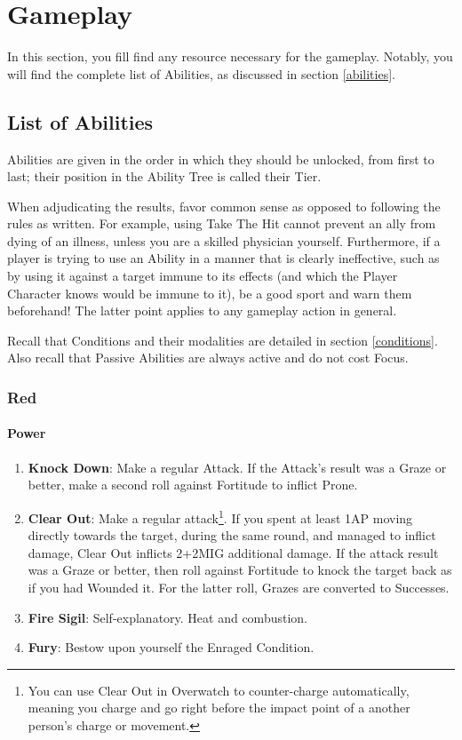 \chapter{Gameplay}

In this section, you fill find any resource necessary for the gameplay. Notably, you will find the complete list of Abilities, as discussed in section \ref{abilities}.

\section{List of Abilities}
\label{abilities_list}

Abilities are given in the order in which they should be unlocked, from first to last; their position in the Ability Tree is called their Tier. 

When adjudicating the results, favor common sense as opposed to following the rules as written. For example, using Take The Hit cannot prevent an ally from dying of an illness, unless you are a skilled physician yourself. Furthermore, if a player is trying to use an Ability in a manner that is clearly ineffective, such as by using it against a target immune to its effects (and which the Player Character knows would be immune to it), be a good sport and warn them beforehand! The latter point applies to any gameplay action in general.

Recall that Conditions and their modalities are detailed in section \ref{conditions}. Also recall that Passive Abilities are always active and do not cost Focus.

\subsection{Red}

\subsubsection{Power}
\begin{enumerate}
    \item \textbf{Knock Down}: Make a regular Attack. If the Attack's result was a Graze or better, make a second roll against Fortitude to inflict Prone.
    \item \textbf{Clear Out}: Make a regular attack\footnote{You can use Clear Out in Overwatch to counter-charge automatically, meaning you charge and go right before the impact point of a another person's charge or movement.}. If you spent at least 1AP moving directly towards the target, during the same round, and managed to inflict damage, Clear Out inflicts 2+2\texttimes MIG additional damage. If the attack result was a Graze or better, then roll against Fortitude to knock the target back as if you had Wounded it. For the latter roll, Grazes are converted to Successes.
    \item \textbf{Fire Sigil}: Self-explanatory. Heat and combustion.
    \item \textbf{Fury}: Bestow upon yourself the Enraged Condition.
\end{enumerate}


